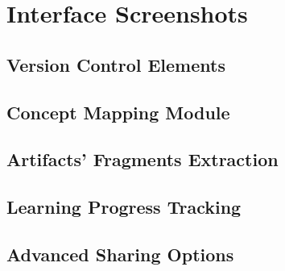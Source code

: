 \chapter{Interface Screenshots \label{cha:appscreen}}

\section{Version Control Elements}

\section{Concept Mapping Module}

\section{Artifacts' Fragments Extraction}

\section{Learning Progress Tracking}

\section{Advanced Sharing Options}